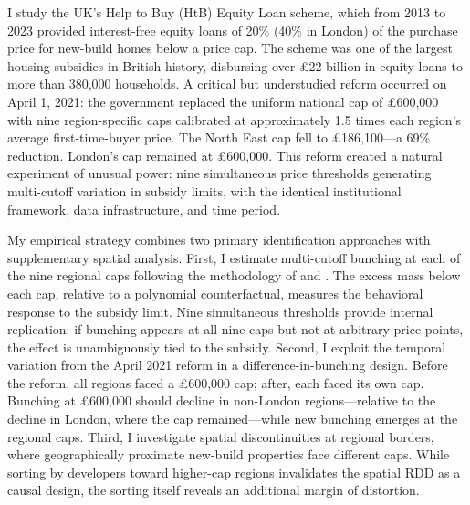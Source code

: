 \documentclass[12pt]{article}
\begin{document}
I study the UK's Help to Buy (HtB) Equity Loan scheme, which from 2013 to 2023 provided interest-free equity loans of 20\% (40\% in London) of the purchase price for new-build homes below a price cap. The scheme was one of the largest housing subsidies in British history, disbursing over \pounds22 billion in equity loans to more than 380,000 households. A critical but understudied reform occurred on April 1, 2021: the government replaced the uniform national cap of \pounds600,000 with nine region-specific caps calibrated at approximately 1.5 times each region's average first-time-buyer price. The North East cap fell to \pounds186,100---a 69\% reduction. London's cap remained at \pounds600,000. This reform created a natural experiment of unusual power: nine simultaneous price thresholds generating multi-cutoff variation in subsidy limits, with the identical institutional framework, data infrastructure, and time period.

My empirical strategy combines two primary identification approaches with supplementary spatial analysis. First, I estimate multi-cutoff bunching at each of the nine regional caps following the methodology of \citet{kleven2013using} and \citet{best2018housing}. The excess mass below each cap, relative to a polynomial counterfactual, measures the behavioral response to the subsidy limit. Nine simultaneous thresholds provide internal replication: if bunching appears at all nine caps but not at arbitrary price points, the effect is unambiguously tied to the subsidy. Second, I exploit the temporal variation from the April 2021 reform in a difference-in-bunching design. Before the reform, all regions faced a \pounds600,000 cap; after, each faced its own cap. Bunching at \pounds600,000 should decline in non-London regions---relative to the decline in London, where the cap remained---while new bunching emerges at the regional caps. Third, I investigate spatial discontinuities at regional borders, where geographically proximate new-build properties face different caps. While sorting by developers toward higher-cap regions invalidates the spatial RDD as a causal design, the sorting itself reveals an additional margin of distortion.
\end{document}
